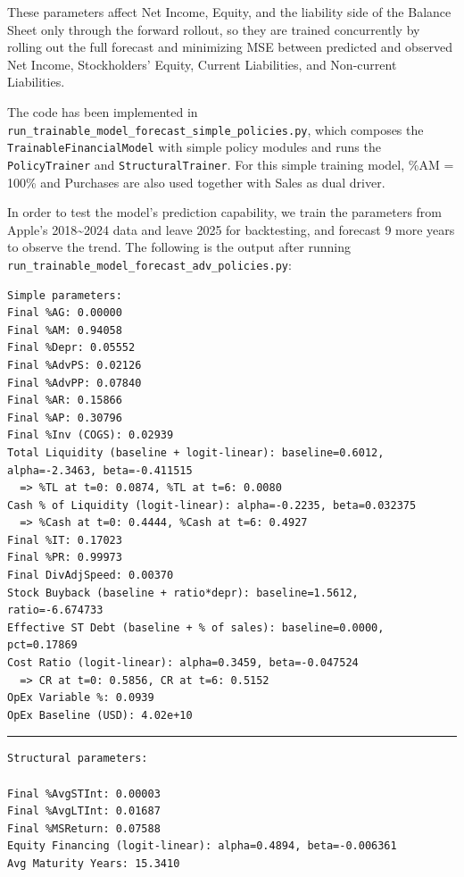 \documentclass[12pt,a4paper]{article}
\begin{document}
These parameters affect Net Income, Equity, and the liability side of
the Balance Sheet only through the forward rollout, so they are trained
concurrently by rolling out the full forecast and minimizing MSE
between predicted and observed Net Income, Stockholders' Equity,
Current Liabilities, and Non-current Liabilities.

The code has been implemented in \texttt{run\_trainable\allowbreak{}\_model\allowbreak{}\_forecast\allowbreak{}\_simple\allowbreak{}\_policies.py},
which composes the \texttt{TrainableFinancialModel} with simple policy modules
and runs the \texttt{PolicyTrainer} and \texttt{StructuralTrainer}. For
this simple training model, \%AM = 100\% and Purchases are also used
together with Sales as dual driver.

In order to test the model's prediction capability, we train the
parameters from Apple's 2018\textasciitilde2024 data and leave 2025 for backtesting, and forecast 9 more years to observe the trend. The following is the output after
running \texttt{run\_trainable\allowbreak{}\_model\allowbreak{}\_forecast\allowbreak{}\_adv\allowbreak{}\_policies.py}:


\begin{lstlisting}[style=console, caption={Trained policy parameters for the advanced-policy model}, label=lst:params_simple_adv]
Simple parameters:
Final %AG: 0.00000
Final %AM: 0.94058
Final %Depr: 0.05552
Final %AdvPS: 0.02126
Final %AdvPP: 0.07840
Final %AR: 0.15866
Final %AP: 0.30796
Final %Inv (COGS): 0.02939
Total Liquidity (baseline + logit-linear): baseline=0.6012, alpha=-2.3463, beta=-0.411515
  => %TL at t=0: 0.0874, %TL at t=6: 0.0080
Cash % of Liquidity (logit-linear): alpha=-0.2235, beta=0.032375
  => %Cash at t=0: 0.4444, %Cash at t=6: 0.4927
Final %IT: 0.17023
Final %PR: 0.99973
Final DivAdjSpeed: 0.00370
Stock Buyback (baseline + ratio*depr): baseline=1.5612, ratio=-6.674733
Effective ST Debt (baseline + % of sales): baseline=0.0000, pct=0.17869
Cost Ratio (logit-linear): alpha=0.3459, beta=-0.047524
  => CR at t=0: 0.5856, CR at t=6: 0.5152
OpEx Variable %: 0.0939
OpEx Baseline (USD): 4.02e+10
\end{lstlisting}

\noindent\rule{\textwidth}{0.4pt}

\begin{lstlisting}[style=console, caption={Trained structural parameters for the advanced-policy model}, label=lst:params_structural_adv]
Structural parameters:

Final %AvgSTInt: 0.00003
Final %AvgLTInt: 0.01687
Final %MSReturn: 0.07588
Equity Financing (logit-linear): alpha=0.4894, beta=-0.006361
Avg Maturity Years: 15.3410
\end{lstlisting}
\end{document}
